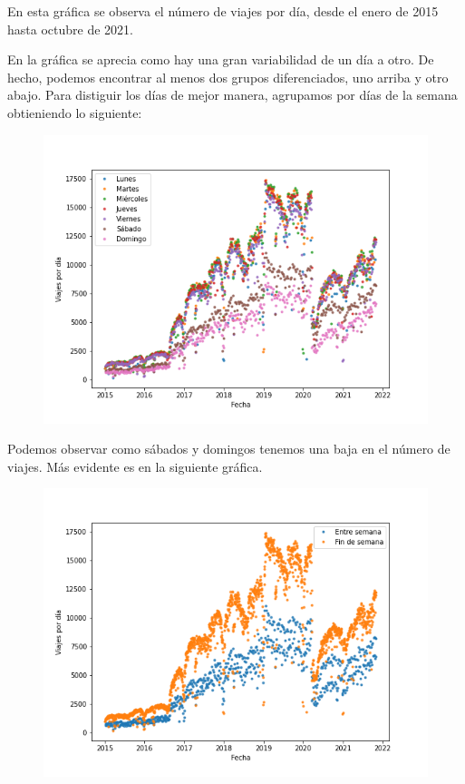 \documentclass[
]{article}
\begin{document}
En esta gráfica se observa el número de viajes por día, desde el enero
de 2015 hasta octubre de 2021.

En la gráfica se aprecia como hay una gran variabilidad de un día a
otro. De hecho, podemos encontrar al menos dos grupos diferenciados, uno
arriba y otro abajo. Para distiguir los días de mejor manera, agrupamos
por días de la semana obtieniendo lo siguiente:

\begin{figure}
\centering
\includegraphics{../plots/trips_daily_by_day.png}
\caption{}
\end{figure}

Podemos observar como sábados y domingos tenemos una baja en el número
de viajes. Más evidente es en la siguiente gráfica.

\begin{figure}
\centering
\includegraphics{../plots/trips_daily_by_weekend.png}
\caption{}
\end{figure}
\end{document}
